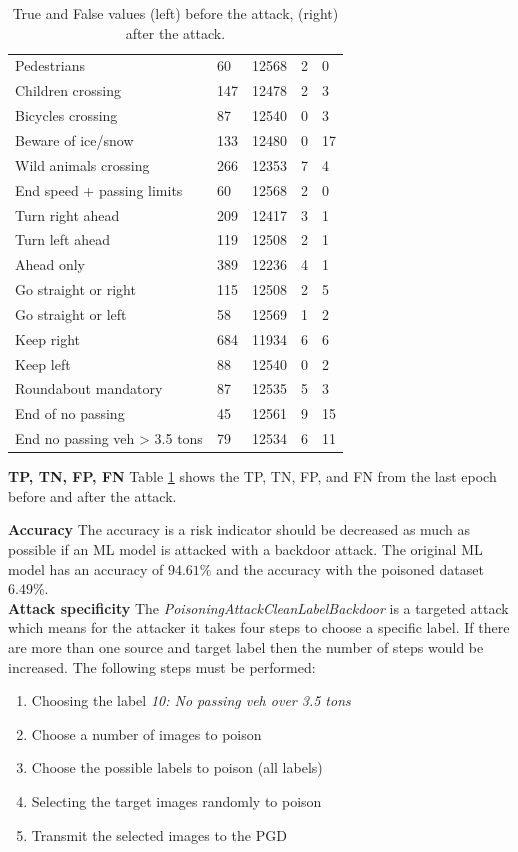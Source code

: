 \begin{table}[ht!]
\begin{tabular}{| l | p{1.5cm} | p{2cm} | p{1.5cm} | p{1.5cm} |}
  Pedestrians & 60 & 12568 & 2 & 0 \\
  Children crossing & 147 & 12478 & 2 & 3 \\
  Bicycles crossing & 87 & 12540 & 0 & 3 \\
  Beware of ice/snow & 133 & 12480 & 0 & 17 \\
  Wild animals crossing & 266 & 12353 & 7 & 4 \\
  End speed + passing limits & 60 & 12568 & 2 & 0\\
  Turn right ahead & 209 & 12417 & 3 & 1 \\
  Turn left ahead & 119 & 12508 & 2 & 1 \\
  Ahead only & 389 & 12236 & 4 & 1 \\
  Go straight or right & 115 & 12508 & 2 & 5 \\
  Go straight or left & 58 & 12569 & 1 & 2 \\
  Keep right & 684 & 11934 & 6 & 6 \\
  Keep left & 88 & 12540 & 0 & 2 \\
  Roundabout mandatory & 87 & 12535 & 5 & 3 \\
  End of no passing & 45 & 12561 & 9 & 15 \\
  End no passing veh > 3.5 tons & 79 & 12534 & 6 & 11 \\
  \hline
  \end{tabular}
  \caption{True and False values (left) before the attack, (right) after the attack.}
  \label{tab:pos_neg}
\end{table}

\textbf{TP, TN, FP, FN} Table \ref{tab:pos_neg} shows the TP, TN, FP, and FN from the last epoch before and after the attack.

\textbf{Accuracy} The accuracy is a risk indicator should be decreased as much as possible if an ML model is attacked with a backdoor attack. The original ML model has an accuracy of $94.61\%$ and the accuracy with the poisoned dataset $6.49\%$. \\

\textbf{Attack specificity} The \textit{PoisoningAttackCleanLabelBackdoor} is a targeted attack which means for the attacker it takes four steps to choose a specific label. If there are more than one source and target label then the number of steps would be increased. The following steps must be performed:

\begin{enumerate}
  \item Choosing the label \textit{10: No passing veh over 3.5 tons}
  \item Choose a number of images to poison
  \item Choose the possible labels to poison (all labels)
  \item Selecting the target images randomly to poison
  \item Transmit the selected images to the PGD
\end{enumerate}

